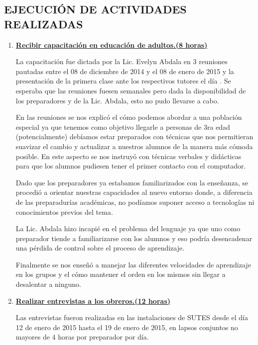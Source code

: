 \documentclass[letterpaper,12pt]{article}
\begin{document}
        \subsection{EJECUCIÓN DE ACTIVIDADES REALIZADAS}
        
            \begin{enumerate}
                \item \underline{\textbf{Recibir capacitación en educación de adultos.(8 horas)}}
                
                La capacitación fue dictada por la Lic. Evelyn Abdala en 3 reuniones pautadas entre el 08 de diciembre de 2014 y el 08 de enero de 2015 y la presentaci\'{o}n de la primera clase ante los respectivos tutores el d\'{i}a . Se esperaba que las reuniones fuesen semanales pero dada la disponibilidad de los preparadores y de la Lic. Abdala, esto no pudo llevarse a cabo.
                
                En las reuniones se nos explic\'{o} el c\'{o}mo podemos abordar a una población especial ya que tenemos como objetivo llegarle a personas de 3ra edad (potencialmente) debíamos estar preparados con técnicas que nos permitieran suavizar el cambio y actualizar a nuestros alumnos de la manera más cómoda posible. En este aspecto se nos instruyó con técnicas verbales y didácticas para que los alumnos pudiesen tener el primer contacto con el computador.
                
                Dado que los preparadores ya estabamos familiarizados con la enseñanza, se procedió a orientar nuestras capacidades al nuevo entorno donde, a diferencia de las preparadurías académicas, no podíamos suponer acceso a tecnologías ni conocimientos previos del tema.
                
                La Lic. Abdala hizo incapié en el problema del lenguaje ya que uno como preparador tiende a familiarizarse con los alumnos y eso podría desencadenar una pérdida de control sobre el proceso de aprendizaje.
                
                Finalmente se nos enseñó a manejar las diferentes velocidades de aprendizaje en los grupos y el cómo mantener el orden en los mismos sin llegar a desalentar a ninguno.
                
                \item \underline{\textbf{Realizar entrevistas a los obreros.(12 horas)}}
                
                Las entrevistas fueron realizadas en las instalaciones de SUTES desde el día 12 de enero de 2015 hasta el 19 de enero de 2015, en lapsos conjuntos no mayores de 4 horas por preparador por día.
                

\end{enumerate}
\end{document}
